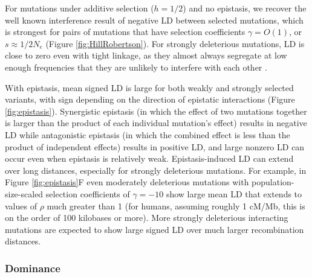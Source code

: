 \documentclass[]{article}
\begin{document}
For mutations under additive selection (\(h=1/2\)) and no epistasis, we
recover the well known \citet{Hill1966-gv} interference result of negative LD
between selected mutations, which is strongest for pairs of mutations that have
selection coefficients \(\gamma = O(1)\), or \(s \approx 1/2N_e\) (Figure
\ref{fig:HillRobertson}).
For strongly deleterious mutations, LD is close to zero even
with tight linkage, as they almost always segregate at low enough frequencies
that they are unlikely to interfere with each other \citep{McVean2000-ox}.

With epistasis, mean signed LD is large for both weakly and strongly selected
variants, with sign depending on the direction of epistatic interactions
(Figure \ref{fig:epistasis}).
Synergistic epistasis (in which the effect of two mutations together is larger than
the product of each individual mutation's effect) results in negative LD while
antagonistic epistasis (in which the combined effect is less than the product of
independent effects) results in positive LD, and large nonzero LD can occur
even when epistasis is relatively weak. Epistasis-induced LD can
extend over long distances, especially for strongly deleterious mutations. For
example, in Figure \ref{fig:epistasis}F even moderately deleterious mutations with
population-size-scaled selection coefficients of \(\gamma=-10\) show large mean
LD that extends to values of \(\rho\) much greater than 1 (for humans, assuming
roughly 1 cM/Mb, this is on the order of 100 kilobases or more).
More strongly deleterious interacting mutations are expected to show large
signed LD over much larger recombination distances.

\subsubsection{Dominance}\label{sec:dominance}
\end{document}
